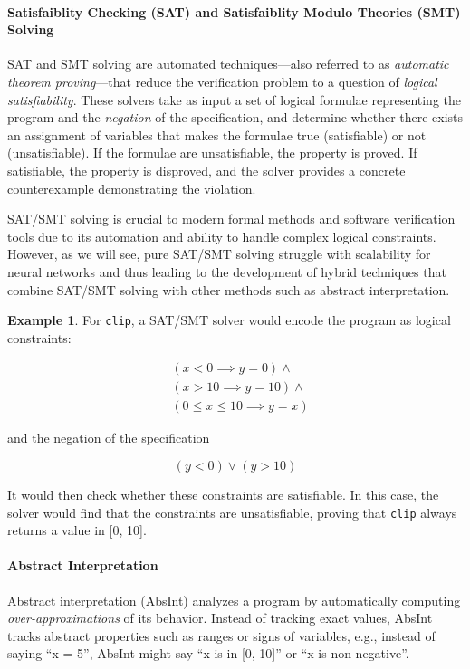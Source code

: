 \documentclass[oneside,11pt,dvipsnames]{book}
\numberwithin{equation}{section}
\theoremstyle{definition}
\newtheorem{example}{Example}[section]
\theoremstyle{remark}
\newcommand{\code}[1]{\texttt{#1}}
\begin{document}
\paragraph{Satisfaiblity Checking (SAT) and Satisfaiblity Modulo Theories (SMT) Solving}
SAT and SMT solving are automated techniques---also referred to as \emph{automatic theorem proving}---that reduce the verification problem to a question of \emph{logical satisfiability}. These solvers take as input a set of logical formulae representing the program and the \emph{negation} of the specification, and determine whether there exists an assignment of variables that makes the formulae true (satisfiable) or not (unsatisfiable). If the formulae are unsatisfiable, the property is proved. If satisfiable, the property is disproved, and the solver provides a concrete counterexample demonstrating the violation.

SAT/SMT solving is crucial to modern formal methods and software verification tools due to its automation and ability to handle complex logical constraints. However, as we will see, pure SAT/SMT solving struggle with scalability for neural networks and thus leading to the development of hybrid techniques that combine SAT/SMT solving with other methods such as abstract interpretation.

\begin{example}
For \code{clip}, a SAT/SMT solver would encode the program as logical constraints: 

\begin{align}
    & (x < 0 \implies y = 0) \land \\
    & (x > 10 \implies y = 10) \land \\
    & (0 \leq x \leq 10 \implies y = x)
\end{align}            

and the negation of the specification

\begin{equation}
    (y < 0) \lor (y > 10)    
\end{equation}

It would then check whether these constraints are satisfiable. In this case, the solver would find that the constraints are unsatisfiable, proving that \code{clip} always returns a value in [0, 10].
\end{example}


\paragraph{Abstract Interpretation}
Abstract interpretation (AbsInt) analyzes a program by automatically computing \emph{over-approximations} of its behavior. Instead of tracking exact values, AbsInt tracks abstract properties such as ranges or signs of variables, e.g., instead of saying ``x = 5'', AbsInt might say ``x is in [0, 10]'' or ``x is non-negative''. 
\end{document}
